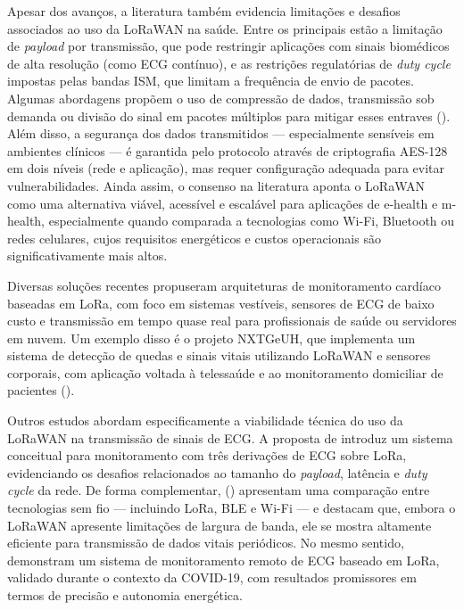 Apesar dos avanços, a literatura também evidencia limitações e desafios associados ao uso da LoRaWAN na saúde. Entre os principais estão a limitação de \textit{payload} por transmissão, que pode restringir aplicações com sinais biomédicos de alta resolução (como \acs{ECG} contínuo), e as restrições regulatórias de \textit{duty cycle} impostas pelas bandas ISM, que limitam a frequência de envio de pacotes. Algumas abordagens propõem o uso de compressão de dados, transmissão sob demanda ou divisão do sinal em pacotes múltiplos para mitigar esses entraves (). Além disso, a segurança dos dados transmitidos — especialmente sensíveis em ambientes clínicos — é garantida pelo protocolo através de criptografia AES-128 em dois níveis (rede e aplicação), mas requer configuração adequada para evitar vulnerabilidades. Ainda assim, o consenso na literatura aponta o LoRaWAN como uma alternativa viável, acessível e escalável para aplicações de e-health e m-health, especialmente quando comparada a tecnologias como Wi-Fi, Bluetooth ou redes celulares, cujos requisitos energéticos e custos operacionais são significativamente mais altos.



Diversas soluções recentes propuseram arquiteturas de monitoramento cardíaco baseadas em LoRa, com foco em sistemas vestíveis, sensores de \acs{ECG} de baixo custo e transmissão em tempo quase real para profissionais de saúde ou servidores em nuvem. Um exemplo disso é o projeto NXTGeUH, que implementa um sistema de detecção de quedas e sinais vitais utilizando LoRaWAN e sensores corporais, com aplicação voltada à telessaúde e ao monitoramento domiciliar de pacientes ().


Outros estudos abordam especificamente a viabilidade técnica do uso da LoRaWAN na transmissão de sinais de \acs{ECG}. A proposta de \cite{3-lead} introduz um sistema conceitual para monitoramento com três derivações de \acs{ECG} sobre LoRa, evidenciando os desafios relacionados ao tamanho do \textit{payload}, latência e \textit{duty cycle} da rede. De forma complementar, \citeauthor{InnovativeWireless} (\citeyear{InnovativeWireless}) apresentam uma comparação entre tecnologias sem fio — incluindo LoRa, BLE e Wi-Fi — e destacam que, embora o LoRaWAN apresente limitações de largura de banda, ele se mostra altamente eficiente para transmissão de dados vitais periódicos. No mesmo sentido, \cite{InnovativeLoRa} demonstram um sistema de monitoramento remoto de \acs{ECG} baseado em LoRa, validado durante o contexto da COVID-19, com resultados promissores em termos de precisão e autonomia energética.

